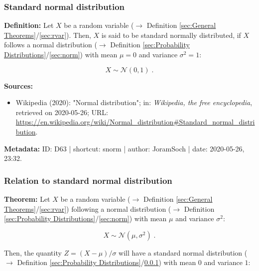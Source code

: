 \documentclass[a4paper,12pt,twoside]{book}
\begin{document}
\subsubsection[\textit{Standard normal distribution}]{Standard normal distribution} \label{sec:snorm}
\setcounter{equation}{0}

\textbf{Definition:} Let $X$ be a random variable ($\rightarrow$ Definition \ref{sec:General Theorems}/\ref{sec:rvar}). Then, $X$ is said to be standard normally distributed, if $X$ follows a normal distribution ($\rightarrow$ Definition \ref{sec:Probability Distributions}/\ref{sec:norm}) with mean $\mu = 0$ and variance $\sigma^2 = 1$:

\begin{equation} \label{eq:snorm-snorm}
X \sim \mathcal{N}(0, 1) \; .
\end{equation}


\vspace{1em}
\textbf{Sources:}
\begin{itemize}
\item Wikipedia (2020): "Normal distribution"; in: \textit{Wikipedia, the free encyclopedia}, retrieved on 2020-05-26; URL: \url{https://en.wikipedia.org/wiki/Normal_distribution#Standard_normal_distribution}.
\end{itemize}


\vspace{1em}
\textbf{Metadata:} ID: D63 | shortcut: snorm | author: JoramSoch | date: 2020-05-26, 23:32.
\vspace{1em}



\subsubsection[\textbf{Relation to standard normal distribution}]{Relation to standard normal distribution} \label{sec:norm-snorm}
\setcounter{equation}{0}

\textbf{Theorem:} Let $X$ be a random variable ($\rightarrow$ Definition \ref{sec:General Theorems}/\ref{sec:rvar}) following a normal distribution ($\rightarrow$ Definition \ref{sec:Probability Distributions}/\ref{sec:norm}) with mean $\mu$ and variance $\sigma^2$:

\begin{equation} \label{eq:norm-snorm-X-norm}
X \sim \mathcal{N}(\mu, \sigma^2) \; .
\end{equation}

Then, the quantity $Z = (X-\mu)/\sigma$ will have a standard normal distribution ($\rightarrow$ Definition \ref{sec:Probability Distributions}/\ref{sec:snorm}) with mean $0$ and variance $1$:
\end{document}
